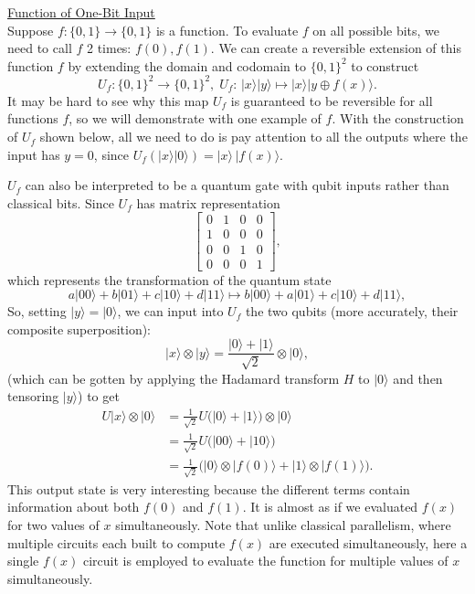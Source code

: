 \documentclass{article}
\theoremstyle{definition}
\begin{document}
\underline{Function of One-Bit Input}\\
Suppose $f: \{0, 1\} \longrightarrow \{0, 1\}$ is a function. To evaluate $f$ on all possible bits, we need to call $f$ 2 times: $f(0), f(1)$. We can create a reversible extension of this function $f$ by extending the domain and codomain to $\{0, 1\}^2$ to construct
\[U_f: \{0, 1\}^2 \longrightarrow \{0, 1\}^2, \; U_f: \, |x \rangle |y\rangle \mapsto |x\rangle |y \oplus f(x) \rangle.\]
It may be hard to see why this map $U_f$ is guaranteed to be reversible for all functions $f$, so we will demonstrate with one example of $f$. With the construction of $U_f$ shown below, all we need to do is pay attention to all the outputs where the input has $y=0$, since $U_f (|x \rangle |0\rangle) = |x \rangle \, |f(x) \rangle$.

$U_f$ can also be interpreted to be a quantum gate with qubit inputs rather than classical bits. Since $U_f$ has matrix representation
\[\begin{bmatrix} 0&1&0&0\\ 1&0&0&0\\ 0&0&1&0\\ 0&0&0&1 \end{bmatrix},\]
which represents the transformation of the quantum state
\[a |00\rangle + b|01\rangle + c|10\rangle + d|11\rangle \mapsto b |00\rangle + a|01\rangle + c|10\rangle + d|11\rangle,\]
So, setting $|y\rangle = |0\rangle$, we can input into $U_f$ the two qubits (more accurately, their composite superposition):
\[|x \rangle \otimes |y\rangle = \frac{|0\rangle + |1\rangle}{\sqrt{2}} \otimes |0\rangle,\]
(which can be gotten by applying the Hadamard transform $H$ to $|0\rangle$ and then tensoring $|y\rangle$) to get
\begin{align*}
  U |x\rangle \otimes |0\rangle & = \frac{1}{\sqrt{2}} U \big( |0\rangle + |1\rangle \big) \otimes |0\rangle \\
  & = \frac{1}{\sqrt{2}} U \big( |00\rangle + |10\rangle \big) \\
  & = \frac{1}{\sqrt{2}} \big( |0\rangle \otimes |f(0)\rangle + |1\rangle \otimes |f(1)\rangle \big).
\end{align*}
This output state is very interesting because the different terms contain information about both $f(0)$ and $f(1)$. It is almost as if we evaluated $f(x)$ for two values of $x$ simultaneously. Note that unlike classical parallelism, where multiple circuits each built to compute $f(x)$ are executed simultaneously, here a single $f(x)$ circuit is employed to evaluate the function for multiple values of $x$ simultaneously.
\end{document}
